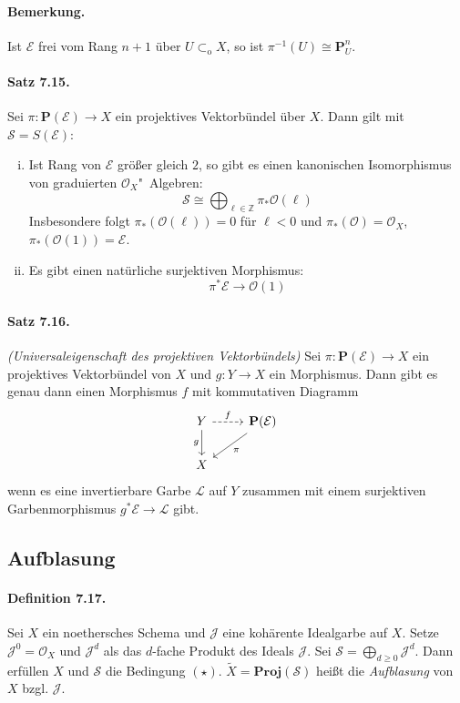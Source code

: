 \documentclass[11pt,b5paper,openany]{memoir}
\begin{document}
\paragraph{Bemerkung.} Ist $\mathcal{E}$ frei vom Rang $n+1$ über $U\subset_\text{o}X$, so ist $\pi^{-1}(U)\cong\mathbf{P}_U^n$.

\paragraph{Satz 7.15.}\label{7.15} Sei $\pi:\mathbf{P}(\mathcal{E})\to X$ ein projektives Vektorbündel über $X$. Dann gilt mit $\mathcal{S}=S(\mathcal{E})$:
\begin{enumerate}[(i)]
\item Ist Rang von $\mathcal{E}$ größer gleich $2$, so gibt es einen kanonischen Isomorphismus von graduierten $\mathcal{O}_X$"~Algebren:
\[\mathcal{S}\cong\bigoplus_{\ell\in\mathbb{Z}}\pi_\ast\mathcal{O}(\ell)\]
Insbesondere folgt $\pi_\ast(\mathcal{O}(\ell))=0$ für $\ell<0$ und $\pi_\ast(\mathcal{O})=\mathcal{O}_X$, $\pi_\ast(\mathcal{O}(1))=\mathcal{E}$.
\item Es gibt einen natürliche surjektiven Morphismus:
\[\pi^\ast\mathcal{E}\to\mathcal{O}(1) \]
\end{enumerate}

\paragraph{Satz 7.16.}\label{7.16} \textit{(Universaleigenschaft des projektiven Vektorbündels)} Sei $\pi:\mathbf{P}(\mathcal{E})\to X$ ein projektives Vektorbündel von $X$ und $g:Y\to X$ ein Morphismus. Dann gibt es genau dann einen Morphismus $f$ mit kommutativen Diagramm
\[\begin{tikzcd}
Y\rar[dashed, "f"]\dar["g"'] &\mathbf{P}(\mathcal{E})\ar[dl, "\pi"]\\
X&
\end{tikzcd}\]
wenn es eine invertierbare Garbe $\mathcal{L}$ auf $Y$ zusammen mit einem surjektiven Garbenmorphismus $g^\ast\mathcal{E}\to\mathcal{L}$ gibt.

\subsection{Aufblasung}

\paragraph{Definition 7.17.}\label{7.17} Sei $X$ ein noethersches Schema und $\mathcal{J}$ eine kohärente Idealgarbe auf $X$. Setze $\mathcal{J}^0=\mathcal{O}_X$ und $\mathcal{J}^d$ als das $d$-fache Produkt des Ideals $\mathcal{J}$. Sei $\mathcal{S}=\bigoplus_{d\geq 0}\mathcal{J}^d$. Dann erfüllen $X$ und $\mathcal{S}$ die Bedingung $(\star)$. $\widetilde{X}=\mathbf{Proj}(\mathcal{S})$ heißt die \textit{Aufblasung} von $X$ bzgl. $\mathcal{J}$.
\end{document}
